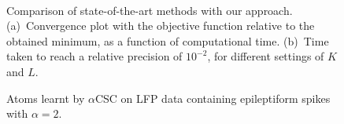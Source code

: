 \begin{figure}[t]
    \centering
      \\
    \caption[Comparison of state-of-the-art methods with our approach.]{Comparison of state-of-the-art methods with our approach. (a)~Convergence plot with the objective function relative to the obtained minimum, as a function of computational time. (b)~Time taken to reach a relative precision of $10^{-2}$, for different settings of $K$ and $L$.  }
    \label{fig:convergence}
\end{figure}

\begin{figure}[b]
    \centering

            \caption[Atoms learnt by $\alpha$CSC on LFP data containing epileptiform spikes with $\alpha=2$.]{Atoms learnt by $\alpha$CSC on LFP data containing epileptiform spikes with $\alpha=2$.}
\end{figure}
